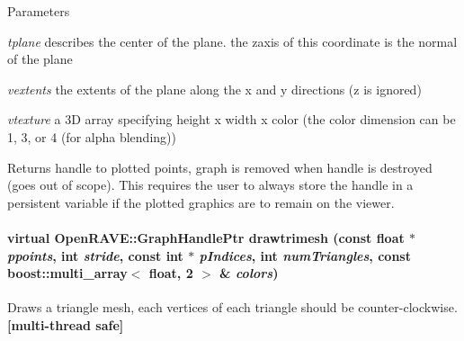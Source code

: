 \begin{DoxyParams}{Parameters}
\item[{\em tplane}]describes the center of the plane. the zaxis of this coordinate is the normal of the plane \item[{\em vextents}]the extents of the plane along the x and y directions (z is ignored) \item[{\em vtexture}]a 3D array specifying height x width x color (the color dimension can be 1, 3, or 4 (for alpha blending)) \end{DoxyParams}
\begin{DoxyReturn}{Returns}
handle to plotted points, graph is removed when handle is destroyed (goes out of scope). This requires the user to always store the handle in a persistent variable if the plotted graphics are to remain on the viewer. 
\end{DoxyReturn}
\hypertarget{classOpenRAVE_1_1EnvironmentBase_ac94bdee4f1ea190eb88bdbff026a35d3}{
\paragraph[{drawtrimesh}]{\setlength{\rightskip}{0pt plus 5cm}virtual OpenRAVE::GraphHandlePtr drawtrimesh (const float $\ast$ {\em ppoints}, \/  int {\em stride}, \/  const int $\ast$ {\em pIndices}, \/  int {\em numTriangles}, \/  const boost::multi\_\-array$<$ float, 2 $>$ \& {\em colors})}\hfill}
\label{classOpenRAVE_1_1EnvironmentBase_ac94bdee4f1ea190eb88bdbff026a35d3}


Draws a triangle mesh, each vertices of each triangle should be counter-\/clockwise. {\bfseries \mbox{[}multi-\/thread safe\mbox{]}} 


